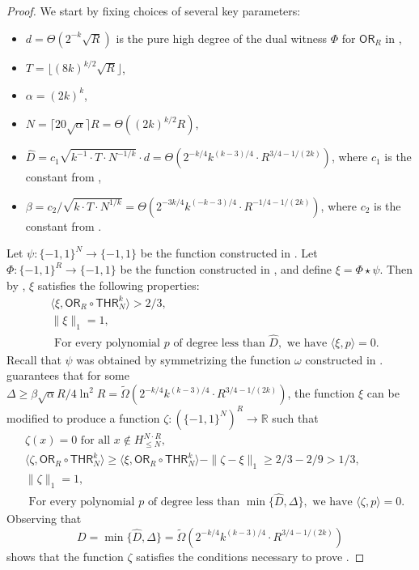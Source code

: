\documentclass[11pt, letterpaper, fleqn]{article}
\theoremstyle{plain}
\newcommand{\R}{\mathbb{R}}
\newcommand{\OR}{\mathsf{ OR}}
\newcommand{\THR}{\mathsf{THR}}
\newcommand{\bits}{\{-1,1\}}
\newcommand{\ls}{\star}
\newcommand{\tOmega}{\tilde{\Omega}}
\begin{document}
\begin{proof}
We start by fixing choices of several key parameters:
\begin{itemize}
\item $d= \Theta(2^{-k}\sqrt{R})$ is the pure high degree of the dual witness $\Phi$ for $\OR_R$ in ,
\item $T =  \lfloor (8k)^{k/2} \sqrt{R}\rfloor$, 
\item $\alpha = (2k)^k$,
\item $N = \lceil 20 \sqrt{\alpha} \rceil R = \Theta((2k)^{k/2} R)$,
\item $\hat{D} = c_1 \sqrt{k^{-1} \cdot T \cdot N^{-1/k}} \cdot d =\Theta(2^{-k/4} k^{(k-3)/4}  \cdot R^{3/4 - 1/(2k)})$, where $c_1$ is the constant from ,
\item $\beta = c_2 / \sqrt{k \cdot T \cdot N^{1/k}} = \Theta(2^{-3k/4} k^{(-k-3)/4} \cdot R^{-1/4 - 1/(2k)})$, where $c_2$ is the constant from .
\end{itemize}

Let $\psi : \bits^N \to \bits$ be the function constructed in . Let $\Phi : \bits^R \to \bits$ be the function constructed in , and define $\xi = \Phi \ls \psi$. Then by , $\xi$ satisfies the following properties:
\begin{align}& \langle \xi, \OR_R \circ \THR_N^k \rangle > 2/3, \\
& \| \xi \|_1 = 1, \\ 
& \text{ For every polynomial } p \text{ of degree less than } \hat{D}, \text{ we have }\langle \xi, p \rangle = 0. 
\end{align}
Recall that $\psi$ was obtained by symmetrizing the function $\omega$ constructed in .
 guarantees that for some $\Delta \ge \beta \sqrt{\alpha} R / 4\ln^2 R = \tOmega(2^{-k/4} k^{(k-3)/4} \cdot R^{3/4 - 1/(2k)})$, the function $\xi$ can be modified to produce a function $\zeta : (\bits^N)^R \to \R$ such that
\begin{align*}
&\zeta(x) = 0 \text{ for all } x \not\in H_{\le N}^{N \cdot R}, \\
&\langle \zeta, \OR_R \circ \THR_N^k \rangle \ge \langle \xi, \OR_R \circ \THR_N^k \rangle - \|\zeta - \xi\|_1 \ge 2/3 - 2/9 > 1/3, \\
&\|\zeta\|_1 = 1, \\
& \text{ For every polynomial } p \text{ of degree less than } \min\{\hat{D}, \Delta\}, \text{ we have }\langle \zeta, p \rangle = 0. 
\end{align*}
Observing that
\[D =  \min\{\hat{D}, \Delta\} = \tOmega(2^{-k/4} k^{(k-3)/ 4} \cdot R^{3/4-1/(2k)})\]
shows that the function $\zeta$ satisfies the conditions necessary to prove .
\end{proof}
\end{document}

